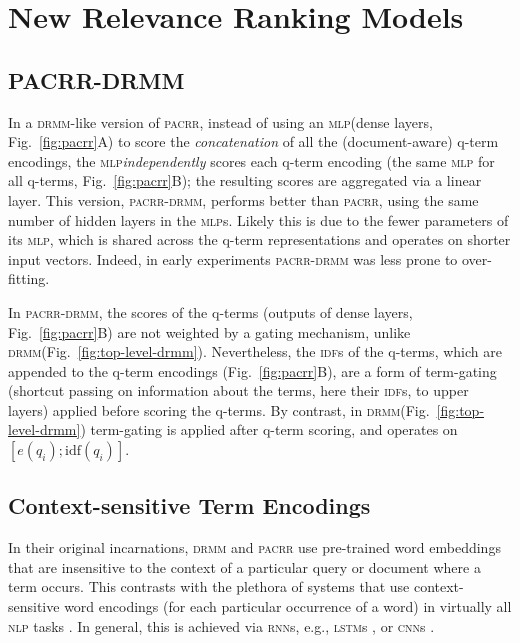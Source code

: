 \documentclass[11pt,a4paper]{article}
\newcommand{\mlp}{\textsc{mlp}\xspace}
\newcommand{\lstm}{\textsc{lstm}\xspace}
\newcommand{\rnn}{\textsc{rnn}\xspace}
\newcommand{\cnn}{\textsc{cnn}\xspace}
\newcommand{\nlp}{\textsc{nlp}\xspace}
\newcommand{\drmm}{\textsc{drmm}\xspace}
\newcommand{\pacrr}{\textsc{pacrr}\xspace}
\newcommand{\pacrrdrmm}{\textsc{pacrr-drmm}\xspace}
\newcommand{\idf}{\textsc{idf}\xspace}
\begin{document}
\section{New Relevance Ranking Models}



\subsection{PACRR-DRMM}
\label{sec:pacrr-drmm}

In a \drmm-like version of \pacrr, instead of 
using an \mlp (dense layers, Fig.~\ref{fig:pacrr}A) to score the 
\emph{concatenation} of all the (document-aware) q-term encodings, the \mlp \emph{independently} scores each q-term encoding
(the same \mlp for all q-terms, Fig.~\ref{fig:pacrr}B); the resulting scores are aggregated via a linear layer. This version, \pacrrdrmm, performs better than \pacrr, using the same number of hidden layers in the \mlp{s}. Likely this is due to the fewer parameters of its \mlp, which is shared across the q-term representations and operates on shorter input vectors. Indeed, in early experiments \pacrrdrmm was less prone to over-fitting. 

In \pacrrdrmm, the scores of the q-terms (outputs of dense layers, Fig.~\ref{fig:pacrr}B) are not weighted by a gating mechanism, unlike \drmm (Fig.~\ref{fig:top-level-drmm}). Nevertheless, the \idf{s} of the q-terms, which are appended to the q-term encodings (Fig.~\ref{fig:pacrr}B), are a form of term-gating (shortcut passing on information about the terms, here their \idf{s}, to upper layers) applied before scoring the q-terms. By contrast, in \drmm (Fig.~\ref{fig:top-level-drmm}) term-gating is applied after q-term scoring, and operates on $[e(q_i); \textrm{idf}(q_i)]$.



\subsection{Context-sensitive Term Encodings}
\label{sec:input-encodings}

In their original incarnations, \drmm and \pacrr use pre-trained word embeddings that are insensitive to the context of a particular query or document where a term occurs. This contrasts with the plethora of systems that use context-sensitive word encodings (for each particular occurrence of a word) in virtually all \nlp tasks \cite{bahdanau2014neural,plank2016multilingual,lample2016neural}. In general, this is achieved via \rnn{s}, e.g., \lstm{s} \cite{gers1999learning}, or \cnn{s} \cite{bai2018empirical}.
\end{document}
